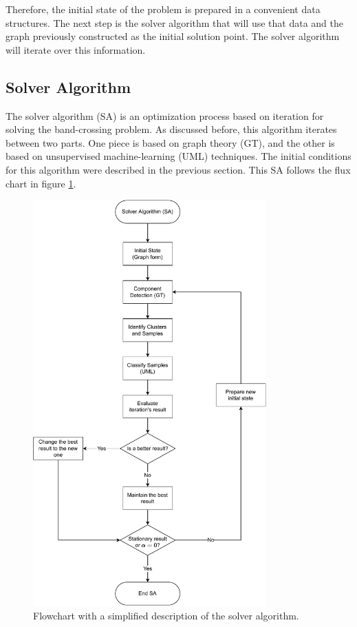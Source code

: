 \documentclass[a4paper,12pt]{report}
\begin{document}
\begin{appendices}
Therefore, the initial state of the problem is prepared in a convenient data structures.
The next step is the solver algorithm that will use that data and the graph previously constructed as the initial solution point.
The solver algorithm will iterate over this information.

\subsection{Solver Algorithm}

The solver algorithm (SA) is an optimization process based on iteration for solving the band-crossing problem.
As discussed before, this algorithm iterates between two parts.
One piece is based on graph theory (GT), and the other is based on unsupervised machine-learning (UML) techniques.
The initial conditions for this algorithm were described in the previous section.
This SA follows the flux chart in figure \ref{fig:flux_chart}.


\begin{figure}
    \centering
    \includegraphics[width=0.8\textwidth]{figures/Fluxchart.pdf}
    \caption{Flowchart with a simplified description of the solver algorithm.}
    \label{fig:flux_chart}
\end{figure}



\end{appendices}
\end{document}
